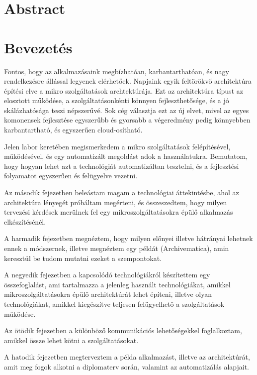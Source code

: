 \documentclass[11pt,magyar,a4paper,oneside,]{report}
\begin{document}
\chapter*{Abstract}\label{abstract}

\chapter{Bevezetés}\label{bevezetuxe9s}

Fontos, hogy az alkalmazásaink megbízhatóan, karbantarthatóan, és nagy
rendelkezésre állással legyenek elérhetőek. Napjaink egyik feltörökvő
architektúra építési elve a mikro szolgáltatások archtektúrája. Ezt az
architektúra típust az elosztott működése, a szolgáltatásonkénti könnyen
fejleszthetősége, és a jó skálázhatósága teszi népszerűvé. Sok cég
választja ezt az új elvet, mivel az egyes komonensek fejlesztése
egyszerűbb és gyorsabb a végeredmény pedig könnyebben karbantartható, és
egyszerűen cloud-osítható.

Jelen labor keretében megismerkedem a mikro szolgáltatások
felépítésével, működésével, és egy automatizált megoldást adok a
használatukra. Bemutatom, hogy hogyan lehet azt a technológiát
automatizáltan tesztelni, és a fejlesztési folyamatot egyszerűen és
felügyelve vezetni.

Az második fejezetben beleástam magam a technológiai áttekintésbe, ahol
az architektúra lényegét próbáltam megérteni, és összeszedtem, hogy
milyen tervezési kérdések merülnek fel egy mikroszolgáltatásokra épülő
alkalmazás elkészítésénél.

A harmadik fejezetben megnéztem, hogy milyen előnyei illetve hátrányai
lehetnek ennek a módszernek, illetve megnéztem egy példát
(Archivematica), amin keresztül be tudom mutatni ezeket a szempontokat.

A negyedik fejezetben a kapcsolódó technológiákról készítettem egy
összefoglalást, ami tartalmazza a jelenleg használt technológiákat,
amikkel mikroszolgáltatásokra épülő architektúrát lehet építeni, illetve
olyan technológiákat, amikkel kiegészítve teljesen felügyelhető a
szolgáltatások működése.

Az ötödik fejezetben a különböző kommunikációs lehetőségekkel
foglalkoztam, amikkel össze lehet kötni a szolgáltatásokat.

A hatodik fejezetben megterveztem a példa alkalmazást, illetve az
architektúrát, amit meg fogok alkotni a diplomaterv során, valamint az
automatizálás alapjait.
\end{document}
